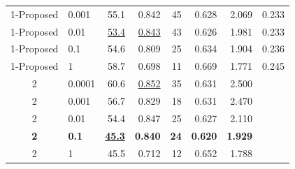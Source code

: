 \documentclass[12pt]{jarticle}
\numberwithin{equation}{section}    %
\numberwithin{figure}{section}      %
\numberwithin{table}{section}      %
\begin{document}
\begin{table}[bt]
\begin{center}
{\begin{tabular}{|c|l|rrrrrr|}
                1-Proposed               & 0.001                                    & 55.1                         & 0.842                     & 45                         & 0.628                         & 2.069                             & 0.233                              \\
                1-Proposed               & 0.01                                     & \underline{53.4}             & \underline{0.843}         & 43                         & 0.626                         & 1.981                             & 0.233                              \\
                1-Proposed               & 0.1                                      & 54.6                         & 0.809                     & 25                         & 0.634                         & 1.904                             & 0.236                              \\
                1-Proposed               & 1                                        & 58.7                         & 0.698                     & 11                         & 0.669                         & 1.771                             & 0.245                              \\
                \hline
                2                        & 0.0001                                   & 60.6                         & \underline{0.852}         & 35                         & 0.631                         & 2.500                             &                                    \\
                2                        & 0.001                                    & 56.7                         & 0.829                     & 18                         & 0.631                         & 2.470                             &                                    \\
                2                        & 0.01                                     & 54.4                         & 0.847                     & 25                         & 0.627                         & 2.110                             &                                    \\
                \textbf{2}               & \textbf{0.1}                             & \underline{\textbf{45.3}}    & \textbf{0.840}            & \textbf{24}                & \textbf{0.620}                & \textbf{1.929}                    &                                    \\
                2                        & 1                                        & 45.5                         & 0.712                     & 12                         & 0.652                         & 1.788                             &                                    \\

\end{tabular}}
\end{center}
\end{table}
\end{document}

